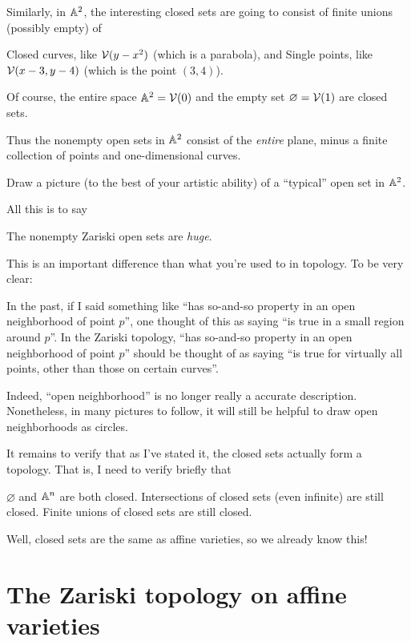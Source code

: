\begin{example}
	Similarly, in $\mathbb A^2$,
	the interesting closed sets are going to consist
	of finite unions (possibly empty) of
	\begin{itemize}
		\ii Closed curves,
		like $\mathcal V(y-x^2)$ (which is a parabola), and
		\ii Single points, like $\mathcal V(x-3,y-4)$
		(which is the point $(3,4)$).
	\end{itemize}
	Of course, the entire space $\mathbb A^2 = \mathcal V(0)$ and the empty set $\varnothing = \mathcal V(1)$
	are closed sets.

	Thus the nonempty open sets in $\mathbb A^2$ consist of the \emph{entire} plane,
	minus a finite collection of points and one-dimensional curves.
\end{example}
\begin{ques}
	Draw a picture (to the best of your artistic ability)
	of a ``typical'' open set in $\mathbb A^2$.
\end{ques}

All this is to say
\begin{moral}
	The nonempty Zariski open sets are \emph{huge}.
\end{moral}
This is an important difference than what you're used to in topology.
To be very clear:
\begin{itemize}
	\ii In the past, if I said something like
	``has so-and-so property in an open neighborhood of point $p$'',
	one thought of this as saying
	``is true in a small region around $p$''.
	\ii In the Zariski topology,
	``has so-and-so property in an open neighborhood of point $p$''
	should be thought of as saying ``is true for virtually all points,
	other than those on certain curves''.
\end{itemize}
Indeed, ``open neighborhood'' is no longer really a accurate description.
Nonetheless, in many pictures to follow,
it will still be helpful to draw open neighborhoods as circles.

It remains to verify that as I've stated it, the closed sets actually form a topology.
That is, I need to verify briefly that
\begin{itemize}
	\ii $\varnothing$ and $\mathbb A^n$ are both closed.
	\ii Intersections of closed sets (even infinite) are still closed.
	\ii Finite unions of closed sets are still closed.
\end{itemize}
Well, closed sets are the same as affine varieties,
so we already know this!

\section{The Zariski topology on affine varieties}

